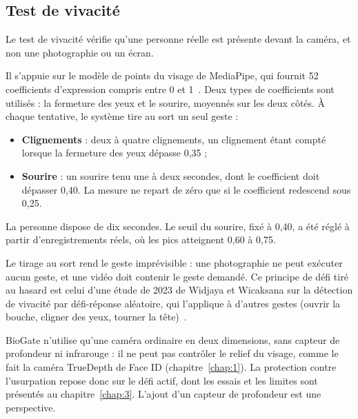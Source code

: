 \subsection{Test de vivacité}

\begin{maj}
Le test de vivacité vérifie qu'une personne réelle est présente devant la caméra, et non une photographie ou un écran.
\end{maj}

Il s'appuie sur le modèle de points du visage de MediaPipe, qui fournit 52 coefficients d'expression compris entre 0 et 1~\cite{google_facelandmarker,mediapipe_blendshape_card}. Deux types de coefficients sont utilisés : la fermeture des yeux et le sourire, moyennés sur les deux côtés. À chaque tentative, le système tire au sort un seul geste :
\begin{itemize}
  \item \textbf{Clignements} : deux à quatre clignements, un clignement étant compté lorsque la fermeture des yeux dépasse 0,35 ;
  \item \textbf{Sourire} : un sourire tenu une à deux secondes, dont le coefficient doit dépasser 0,40. La mesure ne repart de zéro que si le coefficient redescend sous 0,25.
\end{itemize}
\begin{maj}
La personne dispose de dix secondes. Le seuil du sourire, fixé à 0,40, a été réglé à partir d'enregistrements réels, où les pics atteignent 0,60 à 0,75.
\end{maj}

\begin{maj}
Le tirage au sort rend le geste imprévisible : une photographie ne peut exécuter aucun geste, et une vidéo doit contenir le geste demandé. Ce principe de défi tiré au hasard est celui d'une étude de 2023 de Widjaya et Wicaksana sur la détection de vivacité par défi-réponse aléatoire, qui l'applique à d'autres gestes (ouvrir la bouche, cligner des yeux, tourner la tête)~\cite{widjaya2023challenge}.
\end{maj}

\begin{maj}
BioGate n'utilise qu'une caméra ordinaire en deux dimensions, sans capteur de profondeur ni infrarouge : il ne peut pas contrôler le relief du visage, comme le fait la caméra TrueDepth de Face ID (chapitre~\ref{chap:1}). La protection contre l'usurpation repose donc sur le défi actif, dont les essais et les limites sont présentés au chapitre~\ref{chap:3}. L'ajout d'un capteur de profondeur est une perspective.
\end{maj}

